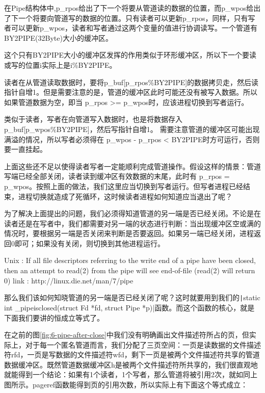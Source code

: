 在Pipe结构体中,p\_rpos给出了下一个将要从管道读的数据的位置，而p\_wpos给出了下一个将要向管道写的数据的位置。只有读者可以更新p\_rpos，同样，只有写者可以更新p\_wpos，读者和写者通过这两个变量的值进行协调读写。一个管道有BY2PIPE(32Byte)大小的缓冲区。

这个只有BY2PIPE大小的缓冲区发挥的作用类似于环形缓冲区，所以下一个要读或写的位置i实际上是i\%BY2PIPE。

读者在从管道读取数据时，要将p\_buf[p\_rpos\%BY2PIPE]的数据拷贝走，然后读指针自增1。但是需要注意的是，管道的缓冲区此时可能还没有被写入数据。所以如果管道数据为空，即当 p\_rpos >= p\_wpos时，应该进程切换到写者运行。

类似于读者，写者在向管道写入数据时，也是将数据存入p\_buf[p\_wpos\%BY2PIPE]，然后写指针自增1。 需要注意管道的缓冲区可能出现满溢的情况，所以写者必须得在 p\_wpos - p\_rpos < BY2PIPE时方可运行，否则要一直挂起。

上面这些还不足以使得读者写者一定能顺利完成管道操作。假设这样的情景：管道写端已经全部关闭，读者读到缓冲区有效数据的末尾，此时有 p\_rpos = p\_wpos。按照上面的做法，我们这里应当切换到写者运行。但写者进程已经结束，进程切换就造成了死循环，这时候读者进程如何知道应当退出了呢？

为了解决上面提出的问题，我们必须得知道管道的另一端是否已经关闭。不论是在读者还是在写者中，我们都需要对另一端的状态进行判断：当出现缓冲区空或满的情况时，要根据另一端是否关闭来判断是否要返回。如果另一端已经关闭，进程返回0即可；如果没有关闭，则切换到其他进程运行。

\begin{note}
Unix : If all file descriptors referring to the write end of a pipe have been closed, then an attempt to read(2) from the pipe will see end-of-file (read(2) will return 0) link : http://linux.die.net/man/7/pipe
\end{note}

那么我们该如何知晓管道的另一端是否已经关闭了呢？这时就要用到我们的\texttt|static int _pipeisclosed(struct Fd *fd, struct Pipe *p)|函数。而这个函数的核心，就是下面我们要讲的恒成立等式了。

在之前的图\ref{fig:6-pipe-after-close}中我们没有明确画出文件描述符所占的页，但实际上，对于每一个匿名管道而言，我们分配了三页空间：一页是读数据的文件描述符rfd，一页是写数据的文件描述符wfd，剩下一页是被两个文件描述符共享的管道数据缓冲区。既然管道数据缓冲区h是被两个文件描述符所共享的，我们很直观地就能得到一个结论：如果有1个读者，1个写者，那么管道将被引用2次，就如同上图所示。pageref函数能得到页的引用次数，所以实际上有下面这个等式成立：

